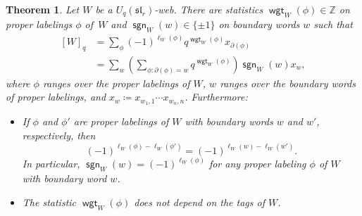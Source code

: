 \documentclass{amsart}
\newtheorem{theorem}{Theorem}[section]
\theoremstyle{definition}
\theoremstyle{remark}
\numberwithin{equation}{section}
\DeclareMathOperator{\sgn}{\mathsf{sgn}}
\newcommand{\fsl}{\mathfrak{sl}}
\DeclareMathOperator{\wgt}{\mathsf{wgt}}
\begin{document}
\begin{theorem}\label{thm:q.Laplace}
Let $W$ be a $U_q(\fsl_r)$-web. There are statistics $\wgt_W(\phi) \in \mathbb{Z}$ on proper labelings $\phi$ of~$W$ and $\sgn_W(w) \in \{\pm 1\}$ on boundary words $w$ such that
\begin{equation}\label{eq:q.Laplace}
\begin{split}
    [W]_q
      &= \sum_\phi (-1)^{\ell_W(\phi)} q^{\wgt_W(\phi)} x_{\partial(\phi)} \\
      &= \sum_w \left(\sum_{\phi : \partial(\phi) = w} q^{\wgt_W(\phi)}\right) \sgn_W(w) x_w,
\end{split}
\end{equation}
where $\phi$ ranges over the proper labelings of $W$, $w$ ranges over the boundary words of proper labelings, and $x_w \coloneqq x_{w_1, 1} \cdots x_{w_n, n}$. Furthermore:
\begin{itemize}
    \item If $\phi$ and $\phi'$ are proper labelings of $W$ with boundary words $w$ and $w'$, respectively, then
    \begin{equation}\label{eq:q.Laplace.2}
        (-1)^{\ell_W(\phi) - \ell_W(\phi')} = (-1)^{\ell_W(w) - \ell_W(w')}.
    \end{equation}
    In particular, $\sgn_W(w) = (-1)^{\ell_W(\phi)}$ for any proper labeling $\phi$ of $W$ with boundary word $w$.
    \item The statistic $\wgt_W(\phi)$ does not depend on the tags of $W$.
    \end{itemize}
\end{theorem}
\end{document}
